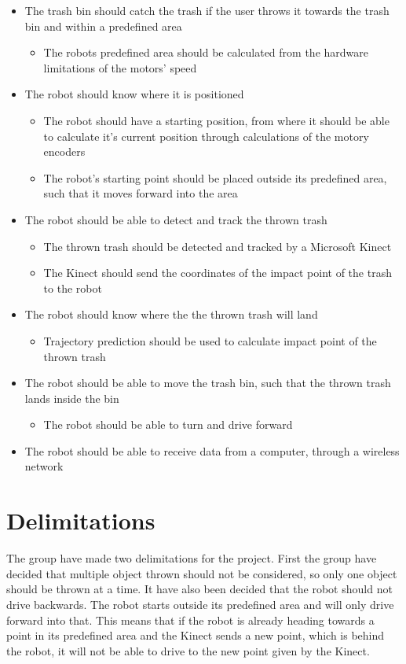 \begin{itemize}
	\item The trash bin should catch the trash if the user throws it towards the trash bin and within a predefined area
	\begin{itemize}
		\item {The robots predefined area should be calculated from the hardware limitations of the motors’ speed}
	\end{itemize}
	\item The robot should know where it is positioned
	\begin{itemize}
		\item{The robot should have a starting position, from where it should be able to calculate it's current position through calculations of the motory encoders}
		\item {The robot's starting point should be placed outside its predefined area, such that it moves forward into the area}
	\end{itemize}
	\item The robot should be able to detect and track the thrown trash
	\begin{itemize}
		\item {The thrown trash should be detected and tracked by a Microsoft Kinect}
		\item {The Kinect should send the coordinates of the impact point of the trash to the robot}
	\end{itemize}
	\item The robot should know where the the thrown trash will land
	\begin{itemize}
		\item {Trajectory prediction should be used to calculate impact point of the thrown trash}
	\end{itemize}
	\item The robot should be able to move the trash bin, such that the thrown trash lands inside the bin
	\begin{itemize}
		\item {The robot should be able to turn and drive forward}
	\end{itemize}
	\item {The robot should be able to receive data from a computer, through a wireless network}
\end{itemize}

\section{Delimitations}
\label{sec:Delimitations}
The group have made two delimitations for the project. First the group have decided that multiple object thrown should not be considered, so only one object should be thrown at a time. \newline
It have also been decided that the robot should not drive backwards. The robot starts outside its predefined area and will only drive forward into that. This means that if the robot is already heading towards a point in its predefined area and the Kinect sends a new point, which is behind the robot, it will not be able to drive to the new point given by the Kinect. 